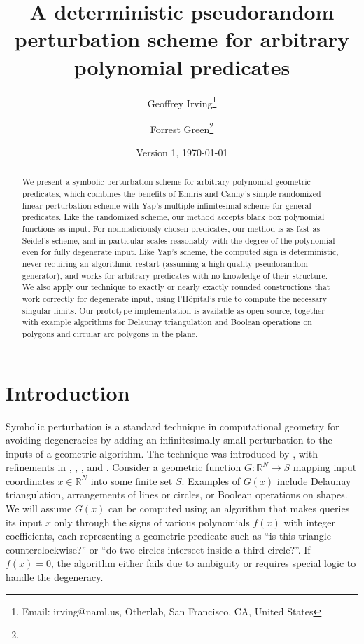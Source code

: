 \documentclass[11pt]{article}
\title{A deterministic pseudorandom perturbation scheme for arbitrary polynomial predicates}
\author{Geoffrey Irving\thanks{Email: irving@naml.us, Otherlab, San Francisco, CA, United States}
\and Forrest Green\thanks{\TODO}}
\date{Version 1, \today}
\newcommand{\R}{\mathbb{R}}
\begin{document}
\maketitle

\begin{abstract}
We present a symbolic perturbation scheme for arbitrary polynomial geometric predicates, which combines the benefits of
Emiris and Canny's simple randomized linear perturbation scheme with Yap's multiple infinitesimal scheme for general predicates.
Like the randomized scheme, our method accepts black box polynomial functions as input.  For nonmaliciously chosen predicates,
our method is as fast as Seidel's scheme, and in particular scales reasonably with the degree of the polynomial even for fully
degenerate input.  Like Yap's scheme, the computed sign is deterministic, never requiring an algorithmic restart (assuming a
high quality pseudorandom generator), and works for arbitrary predicates with no knowledge of their structure.  We also apply
our technique to exactly or nearly exactly rounded constructions that work correctly for degenerate input, using l'H\^opital's
rule to compute the necessary singular limits.  Our prototype implementation is available as open source, together with example
algorithms for Delaunay triangulation and Boolean operations on polygons and circular arc polygons in the plane.
\end{abstract}

\section{Introduction}

Symbolic perturbation is a standard technique in computational geometry for avoiding degeneracies by
adding an infinitesimally small perturbation to the inputs of a geometric algorithm.  The technique was introduced by
\cite{edelsbrunner1990simulation}, with refinements in \cite{yap1990symbolic}, \cite{emiris1992efficient}, \cite{emiris1995general},
and \cite{seidel1998nature}.  Consider a geometric function $G : \R^N \to S$ mapping input coordinates $x \in \R^N$ into
some finite set $S$.  Examples of $G(x)$ include Delaunay triangulation, arrangements of lines or circles, or Boolean operations
on shapes.  We will assume $G(x)$ can be computed using an algorithm that makes queries its input $x$ only through the
signs of various polynomials $f(x)$ with integer coefficients, each representing a geometric predicate such as
``is this triangle counterclockwise?'' or ``do two circles intersect inside a third circle?''.  If $f(x) = 0$, the algorithm
either fails due to ambiguity or requires special logic to handle the degeneracy.
\end{document}
